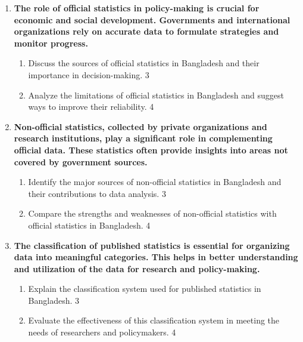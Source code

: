 \documentclass[a4paper,oneside]{book}
\begin{document}
\begin{enumerate}
\begin{enumerate}
  \begin{enumerate}
    \item
	What is official statistics?  \hfill 1
    \item
	What is the role of the United Nations? \hfill 2
    \item  
	What are the limitations of published statistics in Bangladesh? \hfill 3
    \item
	Compare the statistical analysis in Bangladesh with international standard. \hfill 4
  \end{enumerate}
  
  \item
\textbf{The role of official statistics in policy-making is crucial for economic and social development. Governments and international organizations rely on accurate data to formulate strategies and monitor progress.}

\begin{enumerate}
    \item  
    Discuss the sources of official statistics in Bangladesh and their importance in decision-making. \hfill 3
    \item
    Analyze the limitations of official statistics in Bangladesh and suggest ways to improve their reliability. \hfill 4
\end{enumerate}


\item
\textbf{Non-official statistics, collected by private organizations and research institutions, play a significant role in complementing official data. These statistics often provide insights into areas not covered by government sources.}

\begin{enumerate}
    \item  
    Identify the major sources of non-official statistics in Bangladesh and their contributions to data analysis. \hfill 3
    \item
    Compare the strengths and weaknesses of non-official statistics with official statistics in Bangladesh. \hfill 4
\end{enumerate}

\item
\textbf{The classification of published statistics is essential for organizing data into meaningful categories. This helps in better understanding and utilization of the data for research and policy-making.}

\begin{enumerate}
    \item  
    Explain the classification system used for published statistics in Bangladesh. \hfill 3
    \item
    Evaluate the effectiveness of this classification system in meeting the needs of researchers and policymakers. \hfill 4
\end{enumerate}


\end{enumerate}
\end{enumerate}
\end{document}
